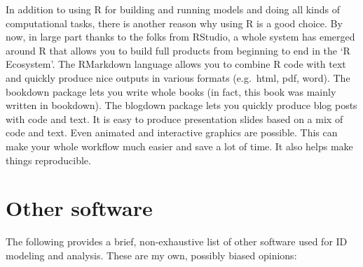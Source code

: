 \documentclass[]{book}
\theoremstyle{definition}
\theoremstyle{definition}
\theoremstyle{definition}
\theoremstyle{remark}
\begin{document}
In addition to using R for building and running models and doing all
kinds of computational tasks, there is another reason why using R is a
good choice. By now, in large part thanks to the folks from RStudio, a
whole system has emerged around R that allows you to build full products
from beginning to end in the `R Ecosystem'. The RMarkdown language
allows you to combine R code with text and quickly produce nice outputs
in various formats (e.g.~html, pdf, word). The bookdown package lets you
write whole books (in fact, this book was mainly written in bookdown).
The blogdown package lets you quickly produce blog posts with code and
text. It is easy to produce presentation slides based on a mix of code
and text. Even animated and interactive graphics are possible. This can
make your whole workflow much easier and save a lot of time. It also
helps make things reproducible.

\hypertarget{other-software}{%
\section{Other software}\label{other-software}}

The following provides a brief, non-exhaustive list of other software
used for ID modeling and analysis. These are my own, possibly biased
opinions:
\end{document}
